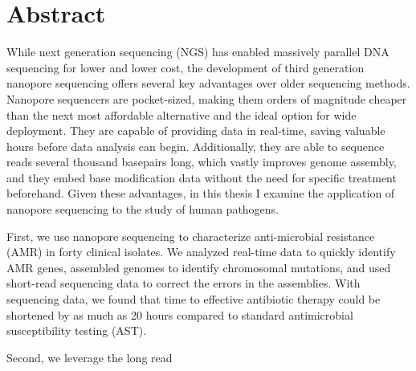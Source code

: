 \chapter*{Abstract}
\label{chap:abstract}

While next generation sequencing (NGS) has enabled massively parallel DNA sequencing for lower and lower cost, the development of third generation nanopore sequencing offers several key advantages over older sequencing methods. Nanopore sequencers are pocket-sized, making them orders of magnitude cheaper than the next most affordable alternative and the ideal option for wide deployment. They are capable of providing data in real-time, saving valuable hours before data analysis can begin. Additionally, they are able to sequence reads several thousand basepairs long, which vastly improves genome assembly, and they embed base modification data without the need for specific treatment beforehand. Given these advantages, in this thesis I examine the application of nanopore sequencing to the study of human pathogens.

First, we use nanopore sequencing to characterize anti-microbial resistance (AMR) in forty clinical isolates. We analyzed real-time data to quickly identify AMR genes, assembled genomes to identify chromosomal mutations, and used short-read sequencing data to correct the errors in the assemblies. With sequencing data, we found that time to effective antibiotic therapy could be shortened by as much as 20 hours compared to standard antimicrobial susceptibility testing (AST).

Second, we leverage the long read 
